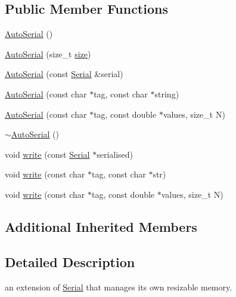 \subsection*{Public Member Functions}
\begin{DoxyCompactItemize}
\item 
\hyperlink{class_frame_lib___parameters_1_1_auto_serial_a633ec0dfc1b5a1bdf67b0932e2c132d4}{Auto\+Serial} ()
\item 
\hyperlink{class_frame_lib___parameters_1_1_auto_serial_ade5aeae38060ad0e691517d3d6bc3600}{Auto\+Serial} (size\+\_\+t \hyperlink{class_frame_lib___parameters_1_1_serial_a04ad46904d9fd8119283eae663901886}{size})
\item 
\hyperlink{class_frame_lib___parameters_1_1_auto_serial_a43c7102d42538b237cbacc3e50c655bf}{Auto\+Serial} (const \hyperlink{class_frame_lib___parameters_1_1_serial}{Serial} \&serial)
\item 
\hyperlink{class_frame_lib___parameters_1_1_auto_serial_a9176c245f71bf8f551870863c23fcd28}{Auto\+Serial} (const char $\ast$tag, const char $\ast$string)
\item 
\hyperlink{class_frame_lib___parameters_1_1_auto_serial_adba1790ca1e0ec5376e36dc38469e057}{Auto\+Serial} (const char $\ast$tag, const double $\ast$values, size\+\_\+t N)
\item 
\hyperlink{class_frame_lib___parameters_1_1_auto_serial_a8332e640a34eca6f4c39dc0bd135fdab}{$\sim$\+Auto\+Serial} ()
\item 
void \hyperlink{class_frame_lib___parameters_1_1_auto_serial_a757e1173895b3dc558a7b1a1c0caaae6}{write} (const \hyperlink{class_frame_lib___parameters_1_1_serial}{Serial} $\ast$serialised)
\item 
void \hyperlink{class_frame_lib___parameters_1_1_auto_serial_ae718f5ffe4041355f80bbd0bb25a8205}{write} (const char $\ast$tag, const char $\ast$str)
\item 
void \hyperlink{class_frame_lib___parameters_1_1_auto_serial_aabe8357d608f708e334dcc7fd22ebddd}{write} (const char $\ast$tag, const double $\ast$values, size\+\_\+t N)
\end{DoxyCompactItemize}
\subsection*{Additional Inherited Members}


\subsection{Detailed Description}
an extension of \hyperlink{class_frame_lib___parameters_1_1_serial}{Serial} that manages its own resizable memory. 

